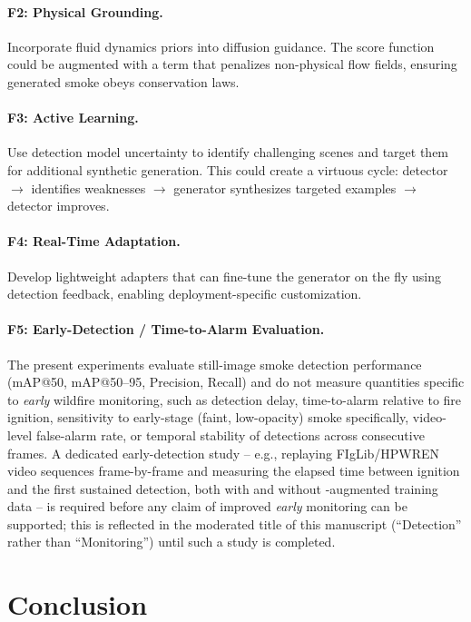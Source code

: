 \documentclass[journal]{IEEEtran}
\begin{document}
\paragraph{F2: Physical Grounding.}
Incorporate fluid dynamics priors into diffusion guidance. The score function could be augmented with a term that penalizes non-physical flow fields, ensuring generated smoke obeys conservation laws.

\paragraph{F3: Active Learning.}
Use detection model uncertainty to identify challenging scenes and target them for additional synthetic generation. This could create a virtuous cycle: detector $\rightarrow$ identifies weaknesses $\rightarrow$ generator synthesizes targeted examples $\rightarrow$ detector improves.

\paragraph{F4: Real-Time Adaptation.}
Develop lightweight adapters that can fine-tune the generator on the fly using detection feedback, enabling deployment-specific customization.

\paragraph{F5: Early-Detection / Time-to-Alarm Evaluation.}
The present experiments evaluate still-image smoke detection performance
(mAP@50, mAP@50--95, Precision, Recall) and do not measure quantities
specific to \emph{early} wildfire monitoring, such as detection delay,
time-to-alarm relative to fire ignition, sensitivity to early-stage
(faint, low-opacity) smoke specifically, video-level false-alarm rate, or
temporal stability of detections across consecutive frames. A dedicated
early-detection study -- e.g., replaying FIgLib/HPWREN video sequences
frame-by-frame and measuring the elapsed time between ignition and the
first sustained detection, both with and without \method-augmented
training data -- is required before any claim of improved \emph{early}
monitoring can be supported; this is reflected in the moderated title of
this manuscript (``Detection'' rather than ``Monitoring'') until such a
study is completed.

\section{Conclusion}
\label{sec:conclusion}
\end{document}
